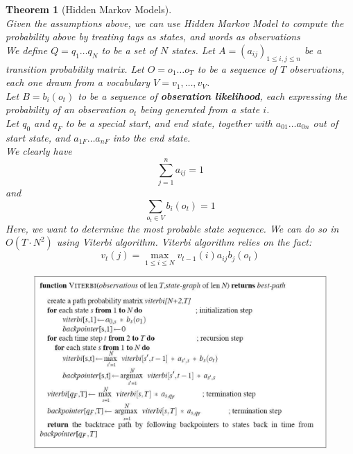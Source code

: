 \documentclass[12pt]{article}
\newtheorem{theorem}{Theorem}[section]
\theoremstyle{definition}
\begin{document}
\begin{theorem}[Hidden Markov Models]
\hfill\\\normalfont Given the assumptions above, we can use Hidden Markov Model to compute the probability above by treating tags as states, and words as observations\\
We define $Q = q_1\ldots q_N$ to be a set of $N$ states. 
Let $A = (a_{ij})_{1\leq i,j\leq n}$ be a transition probability matrix. 
Let $O=o_1\ldots o_T$ to be a sequence of $T$ observations, each one drawn from a vocabulary $V=v_1,\ldots,v_V$.\\
Let $B=b_i(o_t)$ to be a sequence of \textbf{obseration likelihood}, each expressing the probability of an observation $o_t$ being generated from a state $i$.\\
Let $q_0$ and $q_F$ to be a special start, and end state, together with $a_{01}\ldots a_{0n}$ out of start state, and $a_{1F}\ldots a_{nF}$ into the end state.\\
We clearly have
\[
\sum_{j=1}^n a_{ij}=1
\]
and
\[
\sum_{o_t\in V}b_i(o_t)=1
\]
Here, we want to determine the most probable state sequence. We can do so in $O(T\cdot N^2)$ using Viterbi algorithm. Viterbi algorithm relies on the fact:
\[
v_t(j) = \max_{1\leq i\leq N} v_{t-1}(i)a_{ij}b_j(o_t)
\]
\begin{figure}[h]
\centering
\includegraphics[width=\textwidth]{pos_tagging.jpg}
\end{figure}
\end{theorem}
\clearpage
\end{document}
